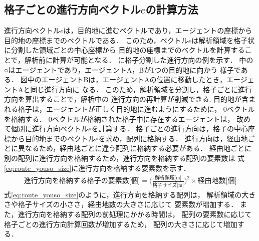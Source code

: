 
\subsection{格子ごとの進行方向ベクトル$e$の計算方法}
進行方向ベクトル$e$は，目的地に進むベクトルであり，エージェントの座標から
目的地の座標までのベクトルである．
このため，ベクトル$e$は解析領域を格子状に分割した領域ごとの中心座標から
目的地の座標までのベクトルを計算することで，解析前に計算が可能となる．
に格子分割した進行方向の例を示す．
%
%
中の○はエージェントであり，エージェントA，Bが1つの目的地に向かう
様子である．
図中のエージェントBは，エージェントAの位置に移動したとき，エージェントAと同じ進行方向に
なる．
このため，解析領域を分割し，格子ごとに進行方向を算出することで，解析中の
進行方向の再計算が削減できる.	
目的地が含まれる格子は，エージェントが正しく目的地に進むようにするために，
0ベクトルを格納する．
0ベクトルが格納された格子中に存在するエージェントは，
改めて個別に進行方向ベクトル$e$を計算する．
格子ごとの進行方向は，格子の中心座標から目的地までのベクトル$e$を求め，配列に格納する．
進行方向は，経由地ごとに異なるため，経由地ごとに違う配列に格納する必要がある．
経由地ごとに別の配列に進行方向を格納するため，進行方向を格納する配列の要素数は
式\eqref{eq:route_youso_size}に進行方向を格納する要素数を示す．
%
\begin{eqnarray}
 \mbox{進行方向を格納する格子の要素数[個]} =  \Big( \frac{\mbox{解析領域[m]}}{\mbox{格子サイズ[m]}} \Big) ^ 2 \times  \mbox{経由地数[個]}
 \label{eq:route_youso_size}
\end{eqnarray}
%
式\eqref{eq:route_youso_size}のように，進行方向を格納する配列は，
解析領域の大きさや格子サイズの小ささ，経由地数の大きさに応じて
要素数が増加する．
また，進行方向を格納する配列の前処理にかかる時間は，
配列の要素数に応じて格子ごとの進行方向計算回数が増加するため，
配列の大きさに応じて増加する．




